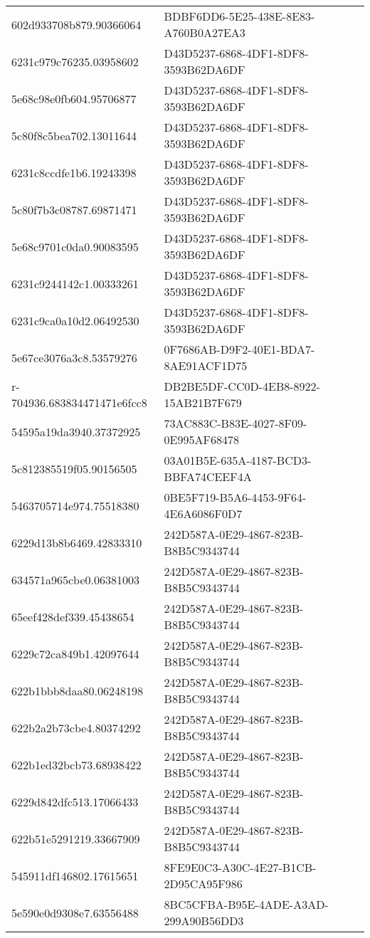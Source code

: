 \begin{tabular}{ll}
602d933708b879.90366064 & BDBF6DD6-5E25-438E-8E83-A760B0A27EA3 \\
6231c979c76235.03958602 & D43D5237-6868-4DF1-8DF8-3593B62DA6DF \\
5e68c98e0fb604.95706877 & D43D5237-6868-4DF1-8DF8-3593B62DA6DF \\
5c80f8c5bea702.13011644 & D43D5237-6868-4DF1-8DF8-3593B62DA6DF \\
6231c8ccdfe1b6.19243398 & D43D5237-6868-4DF1-8DF8-3593B62DA6DF \\
5c80f7b3c08787.69871471 & D43D5237-6868-4DF1-8DF8-3593B62DA6DF \\
5e68c9701c0da0.90083595 & D43D5237-6868-4DF1-8DF8-3593B62DA6DF \\
6231c9244142c1.00333261 & D43D5237-6868-4DF1-8DF8-3593B62DA6DF \\
6231c9ca0a10d2.06492530 & D43D5237-6868-4DF1-8DF8-3593B62DA6DF \\
5e67ce3076a3c8.53579276 & 0F7686AB-D9F2-40E1-BDA7-8AE91ACF1D75 \\
r-704936.683834471471e6fcc8 & DB2BE5DF-CC0D-4EB8-8922-15AB21B7F679 \\
54595a19da3940.37372925 & 73AC883C-B83E-4027-8F09-0E995AF68478 \\
5c812385519f05.90156505 & 03A01B5E-635A-4187-BCD3-BBFA74CEEF4A \\
5463705714e974.75518380 & 0BE5F719-B5A6-4453-9F64-4E6A6086F0D7 \\
6229d13b8b6469.42833310 & 242D587A-0E29-4867-823B-B8B5C9343744 \\
634571a965cbe0.06381003 & 242D587A-0E29-4867-823B-B8B5C9343744 \\
65eef428def339.45438654 & 242D587A-0E29-4867-823B-B8B5C9343744 \\
6229c72ca849b1.42097644 & 242D587A-0E29-4867-823B-B8B5C9343744 \\
622b1bbb8daa80.06248198 & 242D587A-0E29-4867-823B-B8B5C9343744 \\
622b2a2b73cbe4.80374292 & 242D587A-0E29-4867-823B-B8B5C9343744 \\
622b1ed32bcb73.68938422 & 242D587A-0E29-4867-823B-B8B5C9343744 \\
6229d842dfc513.17066433 & 242D587A-0E29-4867-823B-B8B5C9343744 \\
622b51e5291219.33667909 & 242D587A-0E29-4867-823B-B8B5C9343744 \\
545911df146802.17615651 & 8FE9E0C3-A30C-4E27-B1CB-2D95CA95F986 \\
5e590e0d9308e7.63556488 & 8BC5CFBA-B95E-4ADE-A3AD-299A90B56DD3 \\

\end{tabular}

